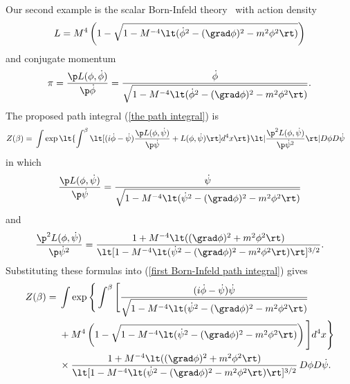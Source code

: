 \documentclass[prd,preprint,floatfix,showpacs]{revtex4-1}
\begin{document}
\par
Our second example is the scalar
Born-Infeld 
theory~\cite{Born:1934gh, *Born:1934dia, *Born:1935ap} 
with action density
\begin{equation}
L = {} M^4 \left( 1 - 
\sqrt{ 1-  M^{-4}
\lt(\dot \phi^2 
- (\grad \phi)^2 - m^2 \phi^2 \rt) }  \right)
\label {Lsqrt}
\end{equation}
and conjugate momentum 
\begin{equation}
\pi = \frac{\p L(\phi, \dot \phi)}{\p \dot \phi}
= \frac{\dot \phi}
{\sqrt{ 1-  M^{-4} \lt(\dot \phi^2 
- (\grad \phi)^2 - m^2 \phi^2 \rt) }} .
\end{equation}
The proposed path integral 
(\ref {the path integral}) is
\begin{equation}
   \begin{split}
Z(\beta)
= {}&  \int \exp \lt\{ \int^\beta \lt[  ( i \dot \phi
- \dot \psi ) \frac{ \p  L(\phi, \dot \psi)  }{ \p \dot \psi }
+ L(\phi, \dot \psi) 
\rt] d^4x \rt\}  
\lt| \frac{ \p^2  L(\phi, \dot \psi) }
{ \p \dot \psi^2  }  \rt|
 D\phi D\dot\psi
 \label {first Born-Infeld path integral}
   \end{split}
\end{equation}
in which 
\begin{equation}
\frac{ \p  L(\phi, \dot \psi)  }{ \p \dot \psi } = 
\frac{\dot \psi}
{\sqrt{ 1-  M^{-4} \lt(\dot \psi^2 
- (\grad \phi)^2 - m^2 \phi^2 \rt) }}
\label {first equation to invert}
\end{equation}
and 
\begin{equation}
\frac{ \p^2  L(\phi, \dot \psi) }{ \p \dot \psi^2  }
={} \frac{1 + M^{-4}\lt((\grad \phi)^2 + m^2 \phi^2\rt)}
{\lt[ 1-  M^{-4} \lt(\dot \psi^2 
- (\grad \phi)^2 - m^2 \phi^2 \rt) \rt]^{3/2} } .
\label {second equation to invert}
\end{equation}
Substituting these formulas into
(\ref {first Born-Infeld path integral}) gives
\begin{equation}
   \begin{split}
Z(\beta)  
= {}& \int \exp \Bigg\{ \int^\beta \Bigg[
\frac{( i \dot \phi - \dot \psi ) \dot \psi}
{\sqrt{ 1-  M^{-4} \lt(\dot \psi^2 
- (\grad \phi)^2 - m^2 \phi^2 \rt) } } 
\\
{}&  {} + M^4 \left( 1 - 
\sqrt{ 1-  M^{-4}
\lt(\dot \psi^2 
- (\grad \phi)^2 - m^2 \phi^2 \rt) } \right)
\Bigg] d^4x \Bigg\}  
\\
{}& \times
\frac{1 + M^{-4}\lt((\grad \phi)^2 + m^2 \phi^2\rt)}
{\lt[ 1-  M^{-4} \lt(\dot \psi^2 
- (\grad \phi)^2 - m^2 \phi^2 \rt) \rt]^{3/2} }
\, D\phi D\dot\psi .
\label {second Born-Infeld path integral}
   \end{split}
\end{equation}
\end{document}
